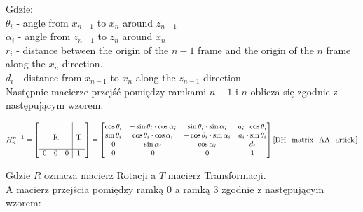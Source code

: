 \documentclass[a4paper,13pt]{article}
\begin{document}
Gdzie: \\
$\theta_i$ - angle from $x_{n-1}$ to $x_n$ around $z_{n-1}$\\
$\alpha_i$ - angle from $z_{n-1}$ to $z_n$ around $x_n$\\
$r_i$ - distance between the origin of the $n-1$ frame and the origin of the $n$ frame along the $x_n$ direction.\\ 
$d_i$ - distance from $x_{n-1}$ to $x_n$ along the $z_{n-1}$ direction\\

Następnie macierze przejść pomiędzy ramkami $n-1$ i $n$ oblicza się zgodnie z następującym wzorem:

\begin{equation}
H^{n-1}_n = 
\left[\begin{array}{ccc|c}
&&&\\
&&&\\
\multicolumn{3}{c|}{\smash{\raisebox{0.75\normalbaselineskip}{R}}} & \smash{\raisebox{0.75\normalbaselineskip}{T}}\\
\hline
0 & 0 & 0 & 1\\
\end{array}\right] = 
\left[\begin{matrix}
\cos{\theta_i} & -\sin{\theta_i} \cdot \cos{\alpha_i} & \sin{\theta_i} \cdot \sin{\alpha_i} & a_i \cdot \cos{\theta_i}\\
\sin{\theta_i} & \cos{\theta_i} \cdot \cos{\alpha_i} & -\cos{\theta_i} \cdot \sin{\alpha_i} & a_i \cdot \sin{\theta_i}\\
0 & \sin{\alpha_i} & \cos{\alpha_i} & d_i\\
0 & 0 & 0 & 1\\
\end{matrix}\right]\cite{DH_matrix_AA_article}
\end{equation}

Gdzie $R$ oznacza macierz Rotacji a $T$ macierz Transformacji.\\

A macierz przejścia pomiędzy ramką 0 a ramką 3 zgodnie z następującym wzorem:
\end{document}
